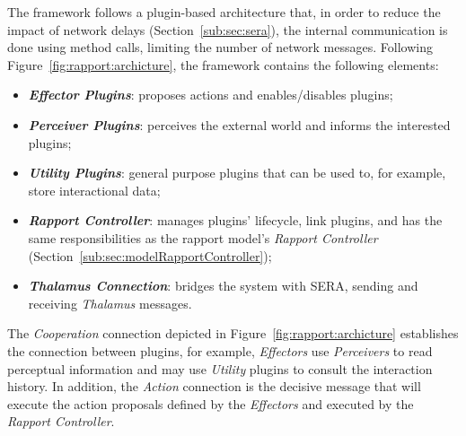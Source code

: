 The framework follows a plugin-based architecture that, in order to reduce the impact of network delays (Section~\ref{sub:sec:sera}), the internal communication is done using method calls, limiting the number of network messages. Following Figure~\ref{fig:rapport:archicture}, the framework contains the following elements:
\begin{itemize}
	\item \textbf{\textit{Effector Plugins}}: proposes actions and enables/disables plugins;
	\item \textbf{\textit{Perceiver Plugins}}: perceives the external world and informs the interested plugins;
	\item \textbf{\textit{Utility Plugins}}: general purpose plugins that can be used to, for example, store interactional data;
	\item \textbf{\textit{Rapport Controller}}: manages plugins' lifecycle, link plugins, and has the same responsibilities as the rapport model's \textit{Rapport Controller} (Section~\ref{sub:sec:modelRapportController});
	\item \textbf{\textit{Thalamus Connection}}: bridges the system with \ac{SERA}, sending and receiving \textit{Thalamus} messages.
\end{itemize}

The \textit{Cooperation} connection depicted in Figure~\ref{fig:rapport:archicture} establishes the connection between plugins, for example, \textit{Effectors} use \textit{Perceivers} to read perceptual information and may use \textit{Utility} plugins to consult the interaction history. In addition, the \textit{Action} connection is the decisive message that will execute the action proposals defined by the \textit{Effectors} and executed by the \textit{Rapport Controller}.



